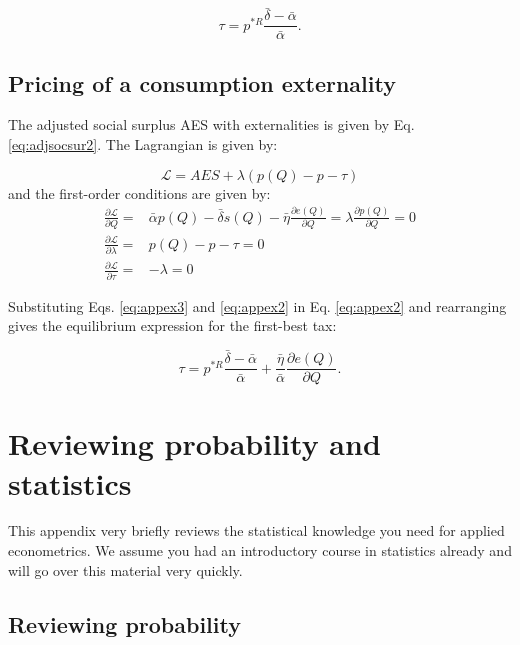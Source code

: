 \documentclass[
]{book}
\begin{document}
\begin{equation}
 \tau = p^{*R} \frac{\bar{\delta} - \bar{\alpha}}{\bar{\alpha}}.
\end{equation}

\hypertarget{apppricing}{%
\section{Pricing of a consumption externality}\label{apppricing}}

The adjusted social surplus AES with externalities is given by Eq. \eqref{eq:adjsocsur2}. The Lagrangian is given by:

\begin{equation}
\mathcal{L} = AES  + \lambda(p(Q) - p - \tau)
\end{equation}
and the first-order conditions are given by:
\begin{align}
  \frac{\partial \mathcal{L}}{\partial Q} =& \bar{\alpha} p(Q) - \bar{\delta} s(Q) - \bar{\eta}\frac{\partial e(Q)}{\partial Q} = \lambda \frac{\partial p(Q)}{\partial Q} = 0 \label{eq:appex1}\\
  \frac{\partial \mathcal{L}}{\partial \lambda} =& p(Q) - p - \tau = 0 \label{eq:appex2}\\
  \frac{\partial \mathcal{L}}{\partial \tau} =& - \lambda = 0 \label{eq:appex3}
\end{align}

Substituting Eqs. \eqref{eq:appex3} and \eqref{eq:appex2} in Eq. \eqref{eq:appex2} and rearranging gives the equilibrium expression for the first-best tax:

\begin{equation}
 \tau = p^{*R} \frac{\bar{\delta} - \bar{\alpha}}{\bar{\alpha}} + \frac{\bar{\eta}}{\bar{\alpha}}\frac{\partial e(Q)}{\partial Q}.
\end{equation}

\hypertarget{appreviewstat}{%
\chapter{Reviewing probability and statistics}\label{appreviewstat}}

This appendix very briefly reviews the statistical knowledge you need for applied econometrics. We assume you had an introductory course in statistics already and will go over this material very quickly.

\hypertarget{reviewing-probability}{%
\section{Reviewing probability}\label{reviewing-probability}}
\end{document}
